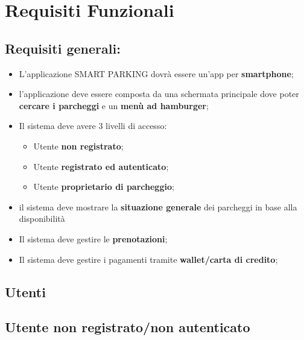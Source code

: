 \section{Requisiti Funzionali}

\subsection{Requisiti generali:}
\label{Requisiti generali}
\begin{itemize}
    \item L’applicazione SMART PARKING dovrà essere un’app per \textbf{smartphone};
    \item l’applicazione deve essere composta da una schermata principale dove poter \textbf{cercare i parcheggi} e un \textbf{menù ad hamburger};
    \item Il sistema deve avere 3 livelli di accesso:
    \begin{itemize}
        \item Utente \textbf{non registrato};
        \item Utente \textbf{registrato ed autenticato};
        \item Utente \textbf{proprietario di parcheggio};
    \end{itemize}
    \item il sistema deve mostrare la \textbf{situazione generale} dei parcheggi in base alla disponibilità
    \item Il sistema deve gestire le \textbf{prenotazioni};
    \item Il sistema deve gestire i pagamenti tramite \textbf{wallet/carta di credito};
\end{itemize}

\subsection{Utenti}
\subsection*{Utente non registrato/non autenticato}

